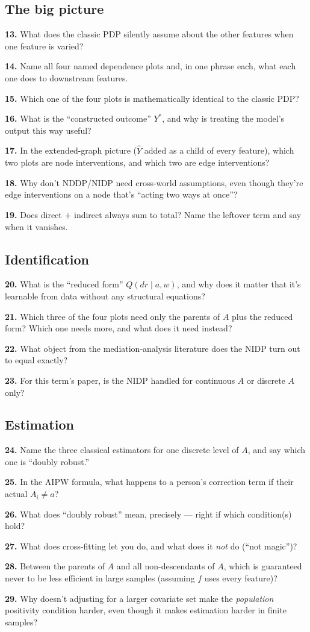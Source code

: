 \documentclass[11pt]{article}
\newcommand{\qa}[2]{\par\noindent\textbf{#1.} #2\par\smallskip}
\begin{document}
\subsection*{The big picture}
\qa{13}{What does the classic PDP silently assume about the other features
  when one feature is varied?}
\qa{14}{Name all four named dependence plots and, in one phrase each, what
  each one does to downstream features.}
\qa{15}{Which one of the four plots is mathematically identical to the
  classic PDP?}
\qa{16}{What is the ``constructed outcome'' $Y^*$, and why is treating the
  model's output this way useful?}
\qa{17}{In the extended-graph picture ($\hat Y$ added as a child of every
  feature), which two plots are node interventions, and which two are edge
  interventions?}
\qa{18}{Why don't NDDP/NIDP need cross-world assumptions, even though
  they're edge interventions on a node that's ``acting two ways at once''?}
\qa{19}{Does direct $+$ indirect always sum to total? Name the leftover
  term and say when it vanishes.}

\subsection*{Identification}
\qa{20}{What is the ``reduced form'' $Q(dr\mid a,w)$, and why does it
  matter that it's learnable from data without any structural equations?}
\qa{21}{Which three of the four plots need only the parents of $A$ plus the
  reduced form? Which one needs more, and what does it need instead?}
\qa{22}{What object from the mediation-analysis literature does the NIDP
  turn out to equal exactly?}
\qa{23}{For this term's paper, is the NIDP handled for continuous $A$ or
  discrete $A$ only?}

\subsection*{Estimation}
\qa{24}{Name the three classical estimators for one discrete level of $A$,
  and say which one is ``doubly robust.''}
\qa{25}{In the AIPW formula, what happens to a person's correction term if
  their actual $A_i \neq a$?}
\qa{26}{What does ``doubly robust'' mean, precisely --- right if which
  condition(s) hold?}
\qa{27}{What does cross-fitting let you do, and what does it \emph{not} do
  (``not magic'')?}
\qa{28}{Between the parents of $A$ and all non-descendants of $A$, which is
  guaranteed never to be less efficient in large samples (assuming $f$ uses
  every feature)?}
\qa{29}{Why doesn't adjusting for a larger covariate set make the
  \emph{population} positivity condition harder, even though it makes
  estimation harder in finite samples?}
\end{document}
